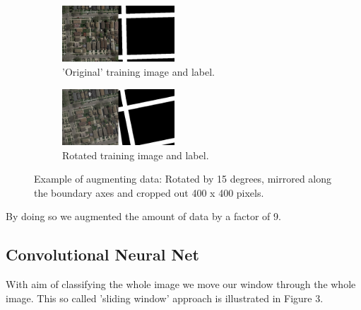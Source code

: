 \documentclass[10pt,conference,compsocconf]{IEEEtran}
\begin{document}
%



\begin{figure}[H]
	\centering
	\begin{subfigure}[htb]{0.2\textwidth}
		\includegraphics[width=4.2cm]{images/data_augment.png}
		\caption{'Original' training image and label.}
		\label{fig:dat}
	\end{subfigure}
	\hspace{1.5em}
	\begin{subfigure}[htb]{0.2\textwidth}
		\includegraphics[width=4.2cm]{images/data_augment_rot.png}
		\caption{Rotated training image and label.}
		\label{fig:datrot}
	\end{subfigure}
	\caption{Example of augmenting data: Rotated by 15 degrees, mirrored along the boundary axes and cropped out 400 x 400 pixels.}
\end{figure}

By doing so we augmented the amount of data by a factor of 9.



\subsection{Convolutional Neural Net}
\label{cnn}
With aim of classifying the whole image we move our window through the whole image. This so called 'sliding window' approach is illustrated in Figure 3.
\end{document}
